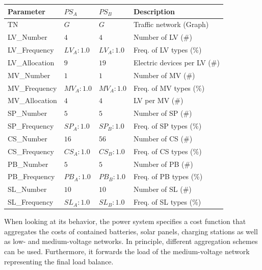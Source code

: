 \begin{table}[h]
	\renewcommand{\arraystretch}{1.3}
	\centering
	\begin{tabularx}{\columnwidth}{lllX}
		\hline
		\textbf{Parameter}     & \textbf{$PS_{A}$} & \textbf{$PS_{B}$}       & \textbf{Description} \\ \hline
		TN              & $G$ & $G$    	  & Traffic network (Graph)     \\
		LV\_Number             & $4$ & $4$            & Number of LV (\#)      \\
		LV\_Frequency          & $LV_{A}:1.0$ & $LV_{A}:1.0$                & Freq. of LV types (\%)      \\
		LV\_Allocation         & $9$ & $19$                 & Electric devices per LV (\#)      \\   
		MV\_Number             & $1$ & $1$        & Number of MV (\#)      \\ 
		MV\_Frequency          & $MV_{A}:1.0$ & $MV_{A}:1.0$                & Freq. of MV types (\%)      \\
		MV\_Allocation         & $4$ & $4$                     & LV per MV (\#)      \\   
		SP\_Number             & $5$ & $5$         & Number of SP (\#)      \\ 
		SP\_Frequency          & $SP_{A}:1.0$ & $SP_{B}:1.0$                & Freq. of SP types (\%)       \\  
		CS\_Number             & $16$  & $56$           & Number of CS (\#)      \\
		CS\_Frequency          & $CS_{A}:1.0$  & $CS_{B}:1.0$               & Freq. of CS types (\%)       \\   
		PB\_Number          & $5$  & $5$              & Number of PB (\#)      \\
		PB\_Frequency          & $PB_{A}:1.0$ & $PB_{B}:1.0$              & Freq. of PB types (\%)       \\ 
		SL\_Number          & $10$ & $10$              & Number of SL (\#)      \\
		SL\_Frequency          & $SL_{A}:1.0$ & $SL_{B}:1.0$              & Freq. of SL types (\%)       \\  \hline  
	\end{tabularx}
\end{table}

When looking at its behavior, the power system specifies a cost function that aggregates the costs of contained batteries, solar panels, charging stations as well as low- and medium-voltage networks. In principle, different aggregation schemes can be used. Furthermore, it forwards the load of the medium-voltage network representing the final load balance.

